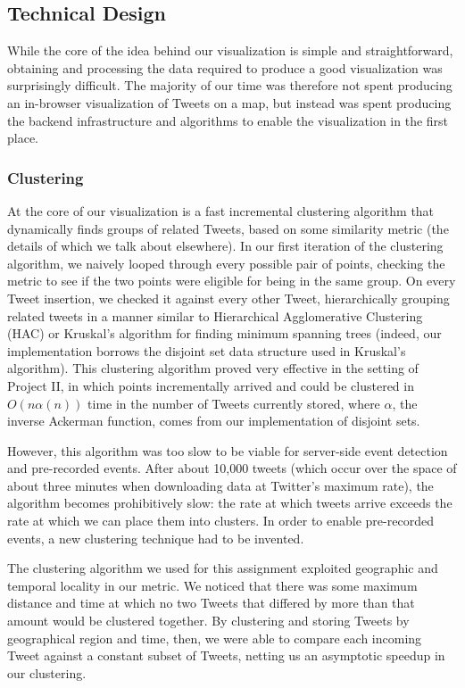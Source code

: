 \documentclass[pdftex,12pt,a4paper]{article}
\begin{document}
\subsection{Technical Design}

While the core of the idea behind our visualization is simple and
straightforward, obtaining and processing the data required to produce a good
visualization was surprisingly difficult. The majority of our time was therefore
not spent producing an in-browser visualization of Tweets on a map, but instead
was spent producing the backend infrastructure and algorithms to enable the
visualization in the first place.

\subsubsection{Clustering}

At the core of our visualization is a fast incremental clustering algorithm that
dynamically finds groups of related Tweets, based on some similarity metric (the
details of which we talk about elsewhere). In our first iteration of the
clustering algorithm, we naively looped through every possible pair of points,
checking the metric to see if the two points were eligible for being in the same
group. On every Tweet insertion, we checked it against every other Tweet,
hierarchically grouping related tweets in a manner similar to Hierarchical
Agglomerative Clustering (HAC) or Kruskal's algorithm for finding minimum
spanning trees (indeed, our implementation borrows the disjoint set data
structure used in Kruskal's algorithm). This clustering algorithm proved very
effective in the setting of Project II, in which points incrementally arrived
and could be clustered in $O(n\alpha(n))$ time in the number of Tweets currently
stored, where $\alpha$, the inverse Ackerman function, comes from our
implementation of disjoint sets.

However, this algorithm was too slow to be viable for server-side event
detection and pre-recorded events. After about 10,000 tweets (which occur over
the space of about three minutes when downloading data at Twitter's maximum
rate), the algorithm becomes prohibitively slow: the rate at which tweets arrive
exceeds the rate at which we can place them into clusters. In order to enable
pre-recorded events, a new clustering technique had to be invented.

The clustering algorithm we used for this assignment exploited geographic and
temporal locality in our metric. We noticed that there was some maximum distance
and time at which no two Tweets that differed by more than that amount would be
clustered together. By clustering and storing Tweets by geographical region and
time, then, we were able to compare each incoming Tweet against a constant
subset of Tweets, netting us an asymptotic speedup in our clustering.
\end{document}
